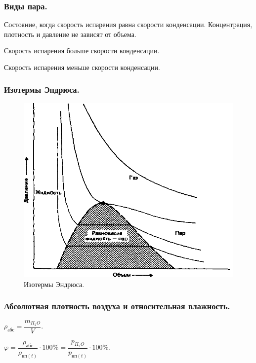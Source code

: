 \documentclass[12pt]{article}
\begin{document}
	\subsubsection{Виды пара.}
	\begin{definition}
		Состояние, когда скорость испарения равна скорости конденсации. Концентрация, плотность и давление не зависят от объема.
	\end{definition}
	\begin{definition}
		Скорость испарения больше скорости конденсации.
	\end{definition}
	\begin{definition}
		Скорость испарения меньше скорости конденсации.
	\end{definition}
	\subsubsection{Изотермы Эндрюса.}
	\begin{figure}[H]
		\includegraphics[height=0.65\textwidth]{extra-materials/Изотермы-Эндрюса}
		\caption{Изотермы Эндрюса.}
	\end{figure}
	\subsubsection{Абсолютная плотность воздуха и относительная влажность.}
	\begin{definition}
		$\rho_{\text{абс}} = \dfrac{m_{H_2O}}{V}$.
	\end{definition}
	\begin{definition}
		$\varphi = \dfrac{\rho_{\text{абс}}}{\rho_{\text{нп}(t)}} \cdot 100 \% = \dfrac{p_{H_2O}}{p_{\text{нп}(t)}} \cdot 100 \%$.
	\end{definition}
\end{document}

